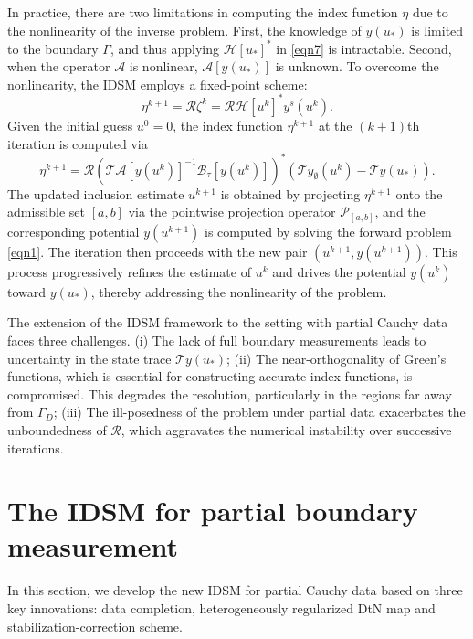 \documentclass[onefignum,onetabnum]{siamart190516}
\numberwithin{equation}{section}
\begin{document}
In practice, there are two limitations in computing the index function $\eta$ due to the nonlinearity of the inverse problem.
First, the knowledge of $y(u_*)$ is limited to the boundary $\Gamma$, and thus applying $\mathcal{H}[u_*]^*$ in \eqref{eqn7} is intractable.
Second, when the operator $\mathcal{A}$ is nonlinear, $\mathcal{A}[y(u_*)]$ is unknown.
To overcome the nonlinearity, the IDSM employs a fixed-point scheme:
\begin{equation}\label{eqn11}
\eta^{k+1} =\mathcal{R}\zeta^{k}= \mathcal{R}\mathcal{H}[u^k]^* y^s(u^k).
\end{equation}
Given the initial guess $u^0 = 0$, the index function $\eta^{k+1}$ at the $(k+1)$th iteration is computed via
\begin{equation*}
\eta^{k+1} = \mathcal{R} \left( \mathcal{T}\mathcal{A}[y(u^k)]^{-1}\mathcal{B}_\tau[y(u^k)] \right)^* \left( \mathcal{T}y_\emptyset(u^k) - \mathcal{T}y(u_{*}) \right).
\end{equation*}
The updated inclusion estimate $u^{k+1}$ is obtained by projecting $\eta^{k+1}$ onto the admissible set $[a, b]$ via the pointwise projection operator $\mathcal{P}_{[a,b]}$, and the corresponding potential $y(u^{k+1})$ is computed by solving the forward problem \eqref{eqn1}.
The iteration then proceeds with the new pair $(u^{k+1}, y(u^{k+1}))$.
This process progressively refines the estimate of $u^k$ and drives the potential $y(u^k)$ toward $y(u_*)$, thereby addressing the nonlinearity of the problem.

The extension of the IDSM framework to the setting with partial Cauchy data faces three challenges. (i) The lack of full boundary measurements leads to uncertainty in the state trace $\mathcal{T}y(u_*)$; (ii) The near-orthogonality of Green’s functions, which is essential for constructing accurate index functions, is compromised. This degrades the resolution, particularly in the regions far away from $\Gamma_D$; (iii) The ill-posedness of the problem under partial data exacerbates the unboundedness of  $\mathcal{R}$, which aggravates the numerical instability over successive iterations.

\section{The IDSM for partial boundary measurement}\label{sec:pbm}
In this section, we develop the new IDSM for partial Cauchy data based on three key innovations: data completion, heterogeneously regularized DtN map and stabilization-correction scheme.
\end{document}
